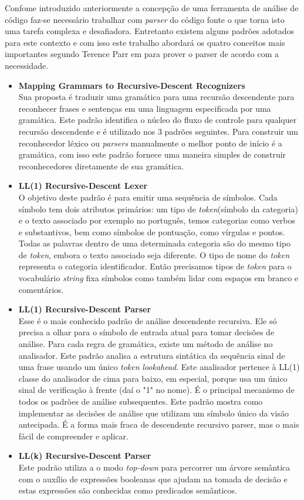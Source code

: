 Confome introduzido anteriormente a concepção de uma ferramenta de análise de código faz-se necessário trabalhar com  \textit{parser} do código fonte o que torna isto uma tarefa complexa e desafiadora. Entretanto existem alguns padrões adotados para este contexto e com isso este trabalho abordará os quatro conceitos  mais importantes segundo Terence Parr em \cite{Parr:2009:LIP:1823613} para prover o parser de acordo com a necessidade.
\begin{itemize}
	\item \textbf{Mapping Grammars to Recursive-Descent Recognizers}\\
	Sua proposta é traduzir uma gramática para uma recursão descendente para reconhecer frases e sentenças em uma linguagem especificada por uma gramática. Este padrão identifica o núcleo do fluxo de controle para qualquer recursão descendente e é utilizado nos 3 padrões seguintes. 
	Para construir um reconhecedor léxico ou \textit{parsers} manualmente o melhor ponto de início é a gramática, com isso este padrão fornece uma maneira simples de construir reconhecedores diretamente de sua gramática.
	
	\item \textbf{LL(1) Recursive-Descent Lexer}\\
	O objetivo deste padrão é para emitir uma sequência de símbolos. Cada símbolo tem dois atributos primários: um tipo de \textit{token}(símbolo da categoria) e o texto associado por exemplo 
	no português, temos categorias como verbos e substantivos, bem como símbolos de pontuação, como vírgulas e pontos. Todas as palavras dentro de uma determinada categoria são do mesmo tipo de \textit{token}, embora o texto associado seja diferente. O tipo de nome do \textit{token} representa o categoria identificador. Então precisamos tipos de \textit{token} para o vocabulário \textit{string} fixa símbolos como também lidar com espaços em branco e comentários.
	\item \textbf{LL(1) Recursive-Descent Parser}\\
	Esse é o mais conhecido padrão de análise descendente recursiva. Ele só precisa	a olhar para o símbolo de entrada atual para tomar decisões de análise. Para cada regra de gramática, existe um método de análise no analisador. Este padrão analisa a estrutura sintática da sequência sinal de uma frase usando um único \textit{token} \textit{lookahead}. Este analisador pertence à LL(1) classe do analisador de cima para baixo, em especial, porque usa um único sinal de verificação à frente (daí o "1" no nome). É o principal mecanismo de todos os padrões de análise subsequentes. Este padrão mostra como implementar as decisões de análise que utilizam um símbolo único da visão antecipada. É a forma mais fraca de descendente recursivo parser, mas o mais fácil de compreender e aplicar.
	\item \textbf{LL(k) Recursive-Descent Parser}\\
	Este padrão utiliza a o modo \textit{top-down} para percorrer um árvore semântica com o auxílio de expressões booleanas que ajudam na tomada de decisão e estas expressões são conhecidas como predicados semânticos.
	
\end{itemize}


%
